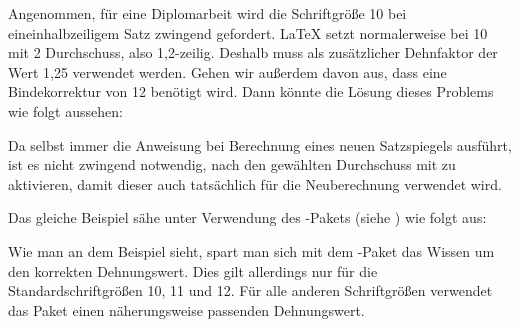\begin{Example}
  Angenommen, für eine Diplomarbeit wird die Schriftgröße
  10 bei eineinhalbzeiligem Satz zwingend gefordert. {\LaTeX}
  setzt normalerweise bei 10 mit 2 Durchschuss,
  also 1,2-zeilig. Deshalb muss als zusätzlicher Dehnfaktor der Wert
  1,25 verwendet werden. Gehen wir außerdem davon aus, dass eine
  Bindekorrektur von 12 benötigt wird. Dann könnte die Lösung
  dieses Problems wie folgt aussehen:
  Da  selbst immer die Anweisung  bei
  Berechnung eines neuen Satzspiegels ausführt, ist es nicht zwingend
  notwendig, nach  den gewählten Durchschuss mit
   zu aktivieren, damit dieser %
\iftrue %
  auch tatsächlich 
\fi %
  für die Neuberechnung verwendet wird.

  Das gleiche Beispiel sähe unter Verwendung des
  -Pakets%
  (siehe \cite{package:setspace}) wie folgt aus:
\end{Example}

Wie man an dem Beispiel sieht, spart man sich mit dem
-Paket das Wissen um den korrekten Dehnungswert. Dies gilt
allerdings nur für die Standardschriftgrößen 10, 11 und
12. Für alle anderen Schriftgrößen verwendet das Paket 
%
\iftrue %
einen näherungsweise passenden Dehnungswert.
%
\else %
eine Näherung.
\fi

